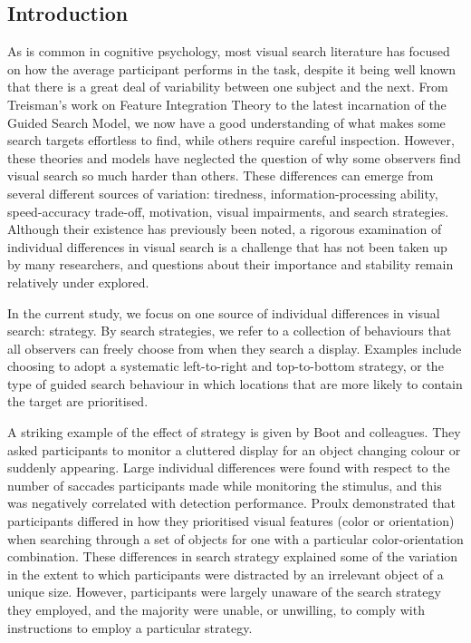 \documentclass[]{rsos}%
\begin{document}
\begin{fmtext}
\section{Introduction}

As is common in cognitive psychology, most visual search literature has focused on how the average participant performs in the task, despite it being well known that there is a great deal of variability between one subject and the next. From Treisman's work on Feature Integration Theory\cite{treisman1980} to the latest incarnation of the Guided Search Model\cite{wolfe2015}, we now have a good understanding of what makes some search targets effortless to find, while others require careful inspection. However, these theories and models have neglected the question of why some observers find visual search so much harder than others. These differences can emerge from several different sources of variation: tiredness\cite{mackworth1948}, information-processing ability, speed-accuracy trade-off, motivation, visual impairments\cite{nowakowska2016}, and search strategies\cite{boot2006}. Although their existence has previously been noted\cite{mackworth1948}, a rigorous examination of individual differences in visual search is a challenge that has not been taken up by many researchers, and questions about their importance and stability remain relatively under explored. 

In the current study, we focus on one source of individual differences in visual search: strategy. By search strategies, we refer to a collection of behaviours that all observers can freely choose from when they search a display. Examples include choosing to adopt a systematic left-to-right and top-to-bottom strategy\cite{gilchrist2006}, or the type of guided search behaviour in which locations that are more likely to contain the target are prioritised\cite{wolfe2015}. 
\end{fmtext}
\maketitle
\twocolumn
A striking example of the effect of strategy is given by Boot and colleagues\cite{boot2006}. They asked participants to monitor a cluttered display for an object changing colour or suddenly appearing. Large individual differences were found with respect to the number of saccades participants made while monitoring the stimulus, and this was negatively correlated with detection performance. Proulx\cite{proulx2011} demonstrated that participants differed in how they prioritised visual features (color or orientation) when searching through a set of objects for one with a particular color-orientation combination. These differences in search strategy explained some of the variation in the extent to which participants were distracted by an irrelevant object of a unique size. However, participants were largely unaware of the search strategy they employed, and the majority were unable, or unwilling, to comply with instructions to employ a particular strategy.
\end{document}
